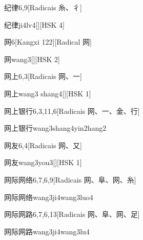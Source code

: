\begin{entry}{纪律}{6,9}[Radicais ⽷、⼻]
  \begin{phonetics}{纪律}{ji4lv4}[][HSK 4]
  \end{phonetics}
\end{entry}

\begin{entry}{网}{6}[Kangxi 122][Radical ⽹]
  \begin{phonetics}{网}{wang3}[][HSK 2]
  \end{phonetics}
\end{entry}

\begin{entry}{网上}{6,3}[Radicais ⽹、⼀]
  \begin{phonetics}{网上}{wang3 shang4}[][HSK 1]
  \end{phonetics}
\end{entry}

\begin{entry}{网上银行}{6,3,11,6}[Radicais ⽹、⼀、⾦、⾏]
  \begin{phonetics}{网上银行}{wang3shang4yin2hang2}
  \end{phonetics}
\end{entry}

\begin{entry}{网友}{6,4}[Radicais ⽹、⼜]
  \begin{phonetics}{网友}{wang3you3}[][HSK 1]
  \end{phonetics}
\end{entry}

\begin{entry}{网际网络}{6,7,6,9}[Radicais ⽹、⾩、⽹、⽷]
  \begin{phonetics}{网际网络}{wang3ji4wang3luo4}
  \end{phonetics}
\end{entry}

\begin{entry}{网际网路}{6,7,6,13}[Radicais ⽹、⾩、⽹、⾜]
  \begin{phonetics}{网际网路}{wang3ji4wang3lu4}
  \end{phonetics}
\end{entry}

